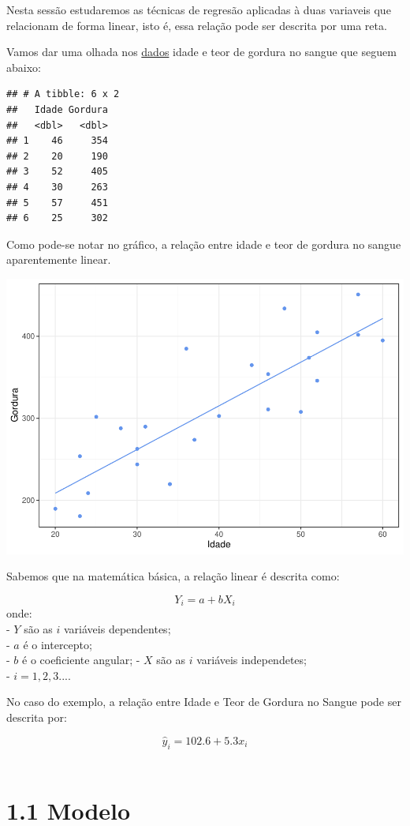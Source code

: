 \documentclass[
]{article}
\begin{document}
Nesta sessão estudaremos as técnicas de regresão aplicadas à duas
variaveis que relacionam de forma linear, isto é, essa relação pode ser
descrita por uma reta.

Vamos dar uma olhada nos
\href{https://people.sc.fsu.edu/~jburkardt/datasets/regression/x09.txt}{dados}
idade e teor de gordura no sangue que seguem abaixo:

\begin{verbatim}
## # A tibble: 6 x 2
##   Idade Gordura
##   <dbl>   <dbl>
## 1    46     354
## 2    20     190
## 3    52     405
## 4    30     263
## 5    57     451
## 6    25     302
\end{verbatim}

Como pode-se notar no gráfico, a relação entre idade e teor de gordura
no sangue aparentemente linear.

\includegraphics{novo_files/figure-latex/unnamed-chunk-4-1.pdf}

Sabemos que na matemática básica, a relação linear é descrita como:

\[Y_i = a+bX_i\] onde:\\
- \(Y\) são as \(i\) variáveis dependentes;\\
- \(a\) é o intercepto;\\
- \(b\) é o coeficiente angular; - \(X\) são as \(i\) variáveis
independetes;\\
- \(i=1,2,3...\).

No caso do exemplo, a relação entre Idade e Teor de Gordura no Sangue
pode ser descrita por:

\[\hat{y}_i = 102.6 + 5.3x_i\] ~

\hypertarget{modelo}{%
\section{1.1 Modelo}\label{modelo}}
\end{document}
